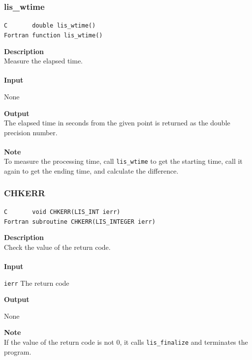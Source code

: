 \documentclass[a4paper]{article}
\newcommand{\namelistlabel}[1]{\mbox{#1}\hfill}
\newenvironment{namelist}[1]{%
\begin{list}{}
  {\let\makelabel\namelistlabel
  \settowidth{\labelwidth}{#1}
  \setlength{\leftmargin}{1.1\labelwidth}}
  }{%
\end{list}}
\begin{document}
\subsubsection{lis\_wtime}
\begin{screen}
\verb|C       double lis_wtime()|\\
\verb|Fortran function lis_wtime()|
\end{screen}
{\bf Description}\\
\indent
Measure the elapsed time. 
\\ \\
\noindent
{\bf Input}
\begin{namelist}{XXXXXXXXXXXXXXXXXXXX}
\item[None]
\end{namelist}
{\bf Output}\\
\indent
The elapsed time in seconds from the given point is returned as the
double precision number.
\\ \\
\noindent
{\bf Note}\\
\indent
To measure the processing time, call \verb|lis_wtime| to get
the starting time, call it again to get the ending time, 
and calculate the difference. 

\subsubsection{CHKERR}
\begin{screen}
\verb|C       void CHKERR(LIS_INT ierr)|\\
\verb|Fortran subroutine CHKERR(LIS_INTEGER ierr)|
\end{screen}
{\bf Description}\\
\indent
Check the value of the return code. 
\\ \\
\noindent
{\bf Input}
\begin{namelist}{XXXXXXXXXXXXXXXXXXXX}
\item[\tt ierr] The return code
\end{namelist}
{\bf Output}
\begin{namelist}{XXXXXXXXXXXXXXXXXXXX}
\item[None] 
\end{namelist}
\noindent
{\bf Note}\\
\indent
If the value of the return code is not 0, it calls \verb|lis_finalize| 
and terminates the program. 
\end{document}
